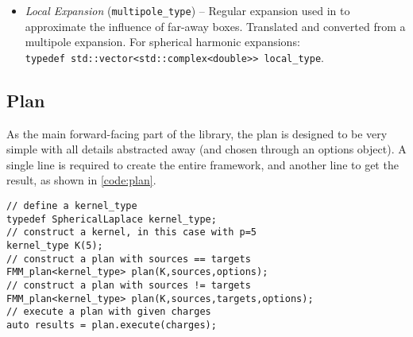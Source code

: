\begin{itemize}

\item \emph{Local Expansion} ({\lstinline|multipole_type|}) -- Regular expansion used in {\fmm} to approximate the influence of far-away boxes. Translated and converted from a multipole expansion. For  spherical harmonic expansions: \\
{\lstinline|typedef std::vector<std::complex<double>> local_type|}.


\end{itemize}

\subsection{Plan}\label{subsec:plan}

As the main forward-facing part of the library, the plan is designed to be very simple with all details abstracted away (and chosen through an options object). A single line is required to create the entire {\fmm} framework, and another line to get the result, as shown in \ref{code:plan}.

\begin{figure*}[h]

\begin{lstlisting}
// define a kernel_type
typedef SphericalLaplace kernel_type;
// construct a kernel, in this case with p=5
kernel_type K(5);
// construct a plan with sources == targets
FMM_plan<kernel_type> plan(K,sources,options);
// construct a plan with sources != targets
FMM_plan<kernel_type> plan(K,sources,targets,options);
// execute a plan with given charges
auto results = plan.execute(charges);
\end{lstlisting}
\caption{\emph{FMM\_plan} interface}
\label{code:plan}

\end{figure*}

